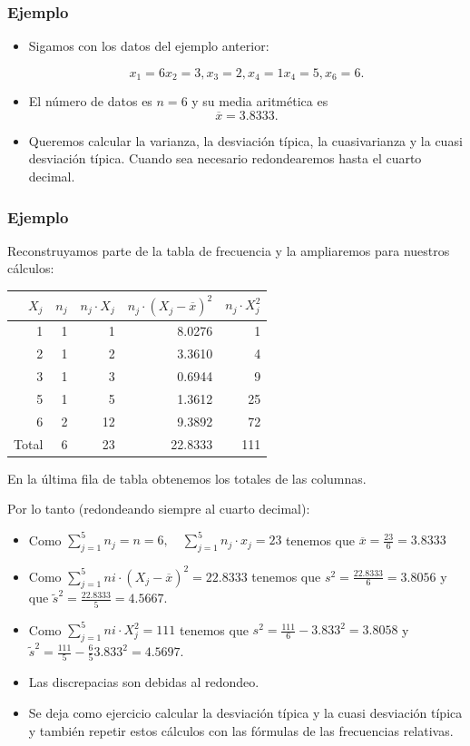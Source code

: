 \begin{frame}
\frametitle{Ejemplo}
\begin{itemize}
\item Sigamos con los datos del ejemplo anterior:

$$x_1=6 x_2=3, x_3=2, x_4= 1 x_4=5,x_6=6.$$

\item El número de datos es $n=6$ y su media aritmética es $$\overline{x}=3.8333.$$

\item Queremos calcular la varianza, la desviación típica, la cuasivarianza y la cuasi desviación típica. Cuando sea necesario redondearemos hasta el cuarto decimal.
\end{itemize}
\end{frame}

\begin{frame}
\frametitle{Ejemplo}
Reconstruyamos parte de la tabla de frecuencia y la ampliaremos para nuestros cálculos:
\begin{table}[ht]
\begin{center}
\begin{tabular}{rrrrr}
  \hline
$X_j$ & $n_j$ & $n_j\cdot X_j$ & $n_j\cdot \left(X_j-\overline{x}\right)^2$ & $n_j\cdot X_j^2$ \\ 
  \hline
1 & 1 & 1 & 8.0276 & 1 \\ 
  2 & 1 & 2 & 3.3610 & 4 \\ 
  3 & 1 & 3 & 0.6944 & 9 \\ 
  5 & 1 & 5 & 1.3612 & 25 \\ 
  6 & 2 & 12 & 9.3892 & 72 \\ 
   \hline
Total &  6 &  23 &  22.8333 &  111
\end{tabular}
\end{center}
\end{table}
En la última fila de tabla   obtenemos los totales de las columnas.
\end{frame}

\begin{frame}
Por lo tanto (redondeando siempre al cuarto decimal):
\begin{itemize}
 \item  Como $\sum_{j=1}^5 n_j=n=6,\quad \sum_{j=1}^5 n_j\cdot x_j=23$ tenemos que $ \overline{x}=\frac{23}{6}=3.8333$
\item Como $\sum_{j=1}^5 ni\cdot(X_j-\overline{x})^2=22.8333$ tenemos que $s^2=\frac{22.8333}{6}=3.8056$ y que $\tilde{s}^2=\frac{22.8333}{5}=4.5667$.
\item Como $\sum_{j=1}^5 ni\cdot X_j^2=111$ tenemos que $s^2=\frac{111}{6}-3.833^2= 3.8058$ 
y $\tilde{s}^2=\frac{111}{5}-\frac{6}{5} 3.833^2= 4.5697$.
\item  Las discrepacias son debidas al redondeo.
\item Se deja como ejercicio calcular la desviación típica y la cuasi desviación típica y también repetir estos cálculos con las fórmulas de las frecuencias relativas.
\end{itemize}
\end{frame}

